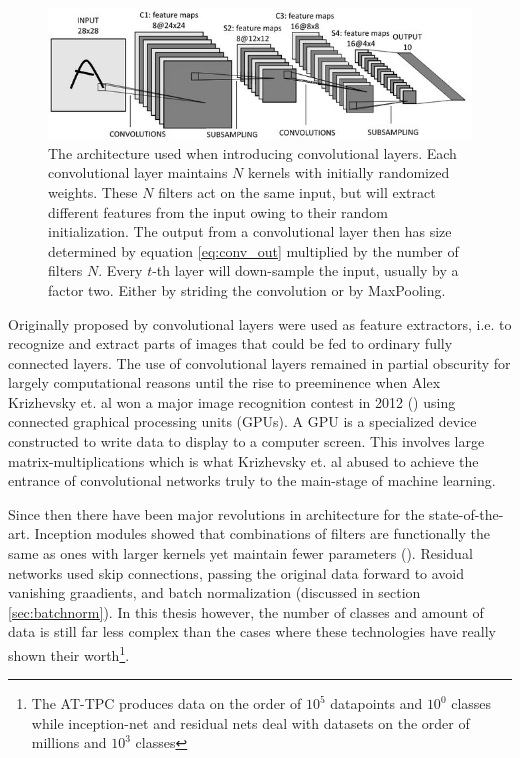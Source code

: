 \begin{figure}
\end{figure}

\begin{figure}
\centering
\includegraphics[width=\textwidth]{../figures/lenet5}
\caption[Original LeNet architecture]{The architecture \citet{Lecun1998} used when introducing convolutional layers. Each convolutional layer maintains $N$ kernels with initially randomized weights. These $N$ filters act on the same input, but will extract different features from the input owing to their random initialization. The output from a convolutional layer then has size determined by equation \ref{eq:conv_out} multiplied by the number of filters $N$. Every $t$-th layer will down-sample the input, usually by a factor two. Either by striding the convolution or by MaxPooling.}\label{fig:lenet5}
\end{figure}

Originally proposed by \citet{Lecun1998} convolutional layers were used as feature extractors, i.e. to recognize and extract parts of images that could be fed to ordinary fully connected layers. The use of convolutional layers remained in partial obscurity for largely computational reasons until the rise to preeminence when Alex Krizhevsky et. al won a major image recognition contest in 2012 (\cite{Krizhevsky2012}) using connected graphical processing units (GPUs). A GPU is a specialized device constructed to write data to display to a computer screen. This involves large matrix-multiplications which is what Krizhevsky et. al abused to achieve the entrance of convolutional networks truly to the main-stage of machine learning. 

Since then there have been major revolutions in architecture for the state-of-the-art. Inception modules showed that combinations of filters are functionally the same as ones with larger kernels yet maintain fewer parameters (\cite{Szegedy2014}). Residual networks used skip connections, passing the original data forward to avoid vanishing graadients, and batch normalization (discussed in section \ref{sec:batchnorm}). In this thesis however, the number of classes and amount of data is still far less complex than the cases where these technologies have really shown their worth\footnote{The AT-TPC produces data on the order of $10^5$ datapoints and $10^0$ classes while inception-net and residual nets deal with datasets on the order of millions and $10^3$ classes}.

